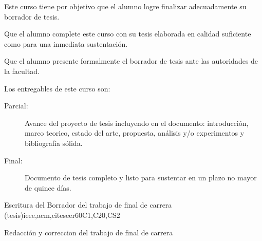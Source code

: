 \begin{syllabus}


\begin{justification}
Este curso tiene por objetivo que el alumno logre finalizar adecuadamente su borrador de tesis.
\end{justification}

\begin{goals}
\item Que el alumno complete este curso con su tesis elaborada en calidad suficiente como para una inmediata sustentación.
\item Que el alumno presente formalmente el borrador de tesis ante las autoridades de la facultad.
\item Los entregables de este curso son:
	\begin{description}
	\item [Parcial:] Avance del proyecto de tesis incluyendo en el documento: introducción, marco teorico, estado del arte, propuesta, análisis y/o experimentos y bibliografía sólida.
	\item [Final:] Documento de tesis completo y listo para sustentar en un plazo no mayor de quince días.
	\end{description}
\end{goals}

\begin{outcomes}
\item {}
\item {}
\item {}
\item {}
\item {}
\item {}
\item {}
\item {}
\end{outcomes}

\begin{competences}
\item {} 
\item {}
\item {}
\end{competences}

\begin{unit}{Escritura del Borrador del trabajo de final de carrera (tesis)}{}{ieee,acm,citeseer}{60}{C1,C20,CS2}
\begin{topics}
    \item Redacción y correccion del trabajo de final de carrera
\end{topics}


\end{unit}
\end{syllabus}
